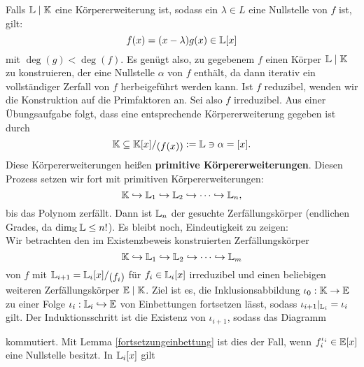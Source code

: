 \begin{beweis}
Falls $\mathbb{L} \mid \mathbb{K}$ eine Körpererweiterung ist, sodass ein $\lambda \in L$ eine Nullstelle von $f$ ist, gilt:
\begin{equation}
f(x) = (x-\lambda) g(x) \in \mathbb{L}[x]
\end{equation}
mit $\deg(g) < \deg(f)$. Es genügt also, zu gegebenem $f$ einen Körper $\mathbb{L} \mid \mathbb{K}$ zu konstruieren, der eine Nullstelle $\alpha$ von $f$ enthält, da dann iterativ ein vollständiger Zerfall von $f$ herbeigeführt werden kann. Ist $f$ reduzibel, wenden wir die Konstruktion auf die Primfaktoren an. Sei also $f$ irreduzibel. Aus einer Übungsaufgabe folgt, dass eine entsprechende Körpererweiterung gegeben ist durch
\begin{equation}
\K \sub \quotient{\K[x]}{(f(x))} := \L \ni \alpha = [x].
\end{equation}
Diese Körpererweiterungen heißen \textbf{primitive Körpererweiterungen}. Diesen Prozess setzen wir fort mit primitiven Körpererweiterungen:
\begin{equation}
\mathbb{K} \hookrightarrow \mathbb{L}_1 \hookrightarrow \mathbb{L}_2 \hookrightarrow \cdots \hookrightarrow \mathbb{L}_n,
\end{equation}
bis das Polynom zerfällt. Dann ist $\mathbb{L}_n$ der gesuchte Zerfällungskörper (endlichen Grades, da $\dim_{\mathbb{K}} \mathbb{L} \leq n!$).
Es bleibt noch, Eindeutigkeit zu zeigen:\\
Wir betrachten den im Existenzbeweis konstruierten Zerfällungskörper 
\begin{equation}
\mathbb{K} \hookrightarrow \mathbb{L}_1 \hookrightarrow \mathbb{L}_2 \hookrightarrow \cdots \hookrightarrow \mathbb{L}_m
\end{equation}
von $f$ mit $\L_{i+1} = \quotient{\L_i[x]}{(f_i)}$ für $f_i \in \mathbb{L}_i[x]$ irreduzibel und einen beliebigen weiteren Zerfällungskörper $\mathbb{E} \mid \mathbb{K}$. Ziel ist es, die Inklusionsabbildung $\iota_0: \mathbb{K} \to \mathbb{E}$ zu einer Folge $\iota_i: \mathbb{L}_i \hookrightarrow \mathbb{E}$ von Einbettungen fortsetzen lässt, sodass $\iota_{i+1}|_{\mathbb{L}_i} = \iota_i$ gilt. Der Induktionsschritt ist die Existenz von $\iota_{i+1}$, sodass das Diagramm
\begin{center}
\end{center}
kommutiert. Mit Lemma \ref{fortsetzungeinbettung} ist dies der Fall, wenn $f_i^{\iota_i} \in \mathbb{E}[x]$ eine Nullstelle besitzt. In $\mathbb{L}_i[x]$ gilt

\end{beweis}
